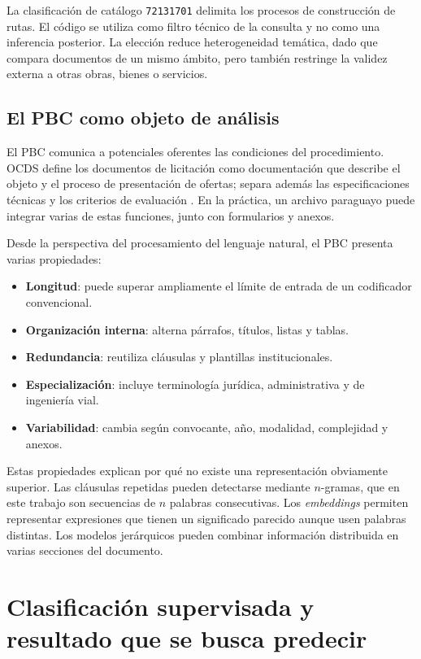 La clasificación de catálogo \texttt{72131701} delimita los procesos de construcción de rutas. El código se utiliza como filtro técnico de la consulta y no como una inferencia posterior. La elección reduce heterogeneidad temática, dado que compara documentos de un mismo ámbito, pero también restringe la validez externa a otras obras, bienes o servicios.

\subsection{El PBC como objeto de análisis}

El PBC comunica a potenciales oferentes las condiciones del procedimiento. OCDS define los documentos de licitación como documentación que describe el objeto y el proceso de presentación de ofertas; separa además las especificaciones técnicas y los criterios de evaluación \parencite{ocdsCodelists}. En la práctica, un archivo paraguayo puede integrar varias de estas funciones, junto con formularios y anexos.

Desde la perspectiva del procesamiento del lenguaje natural, el PBC presenta varias propiedades:

\begin{itemize}
  \item \textbf{Longitud}: puede superar ampliamente el límite de entrada de un codificador convencional.
  \item \textbf{Organización interna}: alterna párrafos, títulos, listas y tablas.
  \item \textbf{Redundancia}: reutiliza cláusulas y plantillas institucionales.
  \item \textbf{Especialización}: incluye terminología jurídica, administrativa y de ingeniería vial.
  \item \textbf{Variabilidad}: cambia según convocante, año, modalidad, complejidad y anexos.
\end{itemize}

Estas propiedades explican por qué no existe una representación obviamente superior. Las cláusulas repetidas pueden detectarse mediante $n$-gramas, que en este trabajo son secuencias de $n$ palabras consecutivas. Los \textit{embeddings} permiten representar expresiones que tienen un significado parecido aunque usen palabras distintas. Los modelos jerárquicos pueden combinar información distribuida en varias secciones del documento.

\section{Clasificación supervisada y resultado que se busca predecir}
\label{sec:clasificacion_supervisada}

